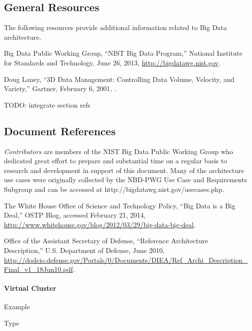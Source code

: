 \documentclass[11pt]{article}
\begin{document}
\subsection{General Resources}

The following resources provide additional information related to Big Data architecture. 

Big Data Public Working Group, “NIST Big Data Program,” National Institute for Standards and 
Technology, June 26, 2013, \url{http://bigdatawg.nist.gov}.

Doug Laney, “3D Data Management: Controlling Data Volume, Velocity, and Variety,” Gartner, February 
6, 2001, \cite{laney013ddata}.

TODO: integrate section refs

\subsection{Document References}

 {\it Contributors} are members of the NIST Big Data Public Working Group who dedicated great effort to prepare 
and substantial time on a regular basis to research and development in support of this document.
  Many of the architecture use cases were originally collected by the NBD-PWG Use Case and Requirements 
Subgroup and can be accessed at http://bigdatawg.nist.gov/usecases.php.

The White House Office of Science and Technology Policy, “Big Data is a Big Deal,” OSTP Blog, accessed 
February 21, 2014, \url{http://www.whitehouse.gov/blog/2012/03/29/big-data-big-deal}.
 
Office of the Assistant Secretary of Defense, “Reference Architecture Description,” U.S. Department of Defense, 
June 2010, \url{http://dodcio.defense.gov/Portals/0/Documents/DIEA/Ref_Archi_Description_Final_v1_18Jun10.pdf}.





\appendix

\paragraph{Virtual Cluster}

Example

\begin{quote}

\end{quote}

Type

\begin{quote}

\end{quote}



 
\end{document}
